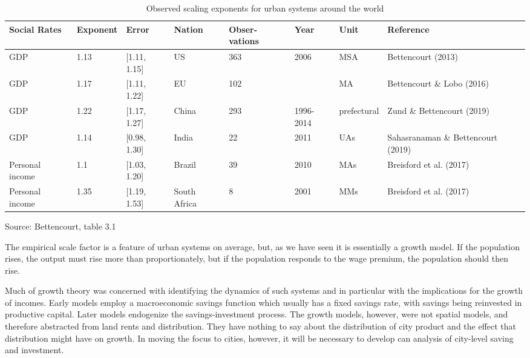  
\begin{table}[htb]\small
    \centering
    \begin{tabular}{|p{1.5cm}|l|l|p{1.5cm}|p{1.4cm}|p{}|l|p{2.5cm}|}\hline
  \textbf{Social Rates}& \textbf{Exponent}&\textbf{Error}& \textbf{Nation} & \textbf{Obser-vations} &\textbf{Year} & \textbf{Unit} & \textbf{Reference}\\ \hline   
GDP             & 1.13 & [1.11, 1.15]  & US        & 363 & 2006 & MSA & Bettencourt (2013) \\ \hline
GDP             &1.17  & [1.11, 1.22]  & EU        & 102 & & MA  & Bettencourt \& Lobo  (2016)\\ \hline
GDP             & 1.22 & [1.17, 1.27]  & China   & 293 & 1996-2014&  prefectural & Zund \& Bettencourt (2019)\\ \hline
GDP             & 1.14 & [0.98, 1.30]  & India      & 22 & 2011 & UAs   & Sahasranaman \& Bettencourt (2019)\\ \hline
Personal income & 1.1  & [1.03, 1.20]  &Brazil       & 39 & 2010  & MAs  & Breisford et al.  (2017) \\ \hline
Personal income & 1.35 & [1.19, 1.53]  &South Africa & 8 & 2001 & MMs  & Breisford et al.  (2017)   \\ \hline
    \end{tabular}
    \caption{Observed scaling exponents for urban systems around the world}
    \label{table-scaling-exponents}
    \small Source: Bettencourt, table 3.1
\end{table}

\vspace{2cm}
The empirical scale factor is a feature of urban systems on average, but, as we have seen it is essentially a growth model. If the population rises, the output must rise more than proportionately, but if the population responds to the wage premium, the population should then rise. 

Much of growth theory was concerned with identifying the dynamics of such systems and in particular with the implications for the growth of incomes. Early models employ a macroeconomic savings function which usually has a fixed savings rate, with savings being reinvested in productive capital. Later models endogenize the savings-investment process. The growth models, however, were not spatial models, and therefore abstracted from land rents and distribution. They have nothing to say about the distribution of city product and the effect that distribution might have on growth. In moving the focus to cities, however, it will be necessary to develop can analysis of city-level saving and investment. 


